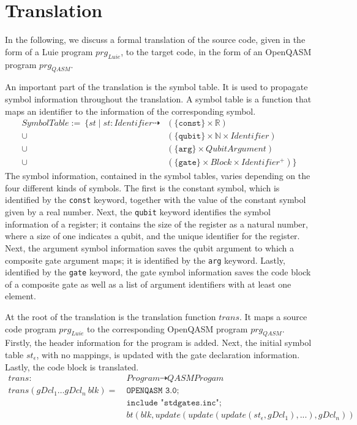 \section{Translation}
\label{sec:concept_translation}
In the following, we discuss a formal translation of the source code, given in the form of a Luie program $prg_{Luie}$, to the target code, in the form of an OpenQASM program $prg_{QASM}$. 

An important part of the translation is the symbol table. It is used to propagate symbol information throughout the translation. A symbol table is a function that maps an identifier to the information of the corresponding symbol.
\begin{align*}
    SymbolTable := \ \{st \mid st : Identifier \dashrightarrow & (\{\texttt{const}\} \times \mathbb{R})\\
     \cup& (\{\texttt{qubit}\} \times \mathbb{N} \times Identifier)\\
     \cup& (\{\texttt{arg}\} \times QubitArgument)\\
     \cup& (\{\texttt{gate}\} \times Block \times Identifier^+)
    \}
\end{align*}
The symbol information, contained in the symbol tables, varies depending on the four different kinds of symbols. The first is the constant symbol, which is identified by the \texttt{const} keyword, together with the value of the constant symbol given by a real number. Next, the \texttt{qubit} keyword identifies the symbol information of a register; it contains the size of the register as a natural number, where a size of one indicates a qubit, and the unique identifier for the register. Next, the argument symbol information saves the qubit argument to which a composite gate argument maps; it is identified by the \texttt{arg} keyword. Lastly, identified by the \texttt{gate} keyword, the gate symbol information saves the code block of a composite gate as well as a list of argument identifiers with at least one element. 

At the root of the translation is the translation function $trans$. It maps a source code program $prg_{Luie}$ to the corresponding OpenQASM program $prg_{QASM}$. Firstly, the header information for the program is added. Next, the initial symbol table $st_\epsilon$, with no mappings, is updated with the gate declaration information. Lastly, the code block is translated. 
\begin{align*}
    trans : \ & Program \dashrightarrow QASMProgam\\
    trans(gDcl_1 \dots gDcl_n \ blk) = \ & \texttt{OPENQASM 3.0;}\\
                & \texttt{include "stdgates.inc";}\\
                & bt(blk, update(update(update(st_\epsilon, gDcl_1), ...), gDcl_n))
\end{align*}  

